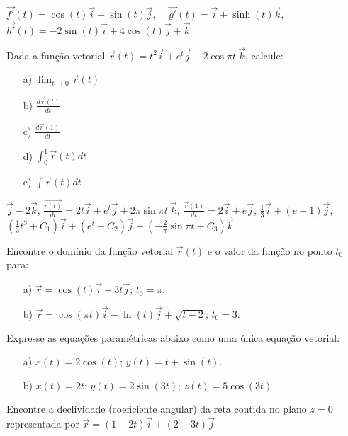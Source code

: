\begin{resp} $\vec{f'}(t)=\cos(t)\vec{i}-\sin(t)\vec{j}$,~~ $\vec{g'}(t)= \vec{i}+\sinh(t)\vec{k}$, ~~$\vec{h'}(t)=-2\sin(t)\vec{i}+4\cos(t)\vec{j}+\vec{k}$
\end{resp}
\begin{exer} Dada a função vetorial $\vec{r}(t)=t^2\vec{i}+e^t\vec{j}-2\cos\pi t ~\! \vec{k}$, calcule:
\begin{itemize}
\item [a)] $\displaystyle \lim_{t\to 0} \vec{r}(t)$
\item [b)] $\displaystyle \frac{d \vec{r}(t)}{dt}$
\item [c)] $\displaystyle \frac{d\vec{r}(1)}{dt}$
\item [d)] $\displaystyle \int_0^1 \vec{r}(t)dt$
\item [e)] $\displaystyle \int \vec{r}(t)dt$
\end{itemize}
\end{exer}
\begin{resp} $\vec{j}-2\vec{k}$, $\frac{\vec{r(t)}}{dt}=2t\vec{i}+e^t\vec{j}+2\pi\sin\pi t ~\! \vec{k}$, $\frac{\vec{r}(1)}{dt}=2\vec{i}+e\vec{j}$, $\frac{1}{3}\vec{i}+(e-1)\vec{j}$, $\left(\frac{1}{3}t^3+C_1\right)\vec{i}+\left(e^t+C_2\right)\vec{j}+\left(-\frac{2}{\pi}\sin\pi t+C_3\right)\vec{k}$
\end{resp}
\begin{exer}Encontre o domínio da função vetorial $\vec{r}(t)$ e o valor da função no ponto $t_0$ para:
\begin{itemize}
 \item[a)] $\vec{r}=\cos(t)\vec{i}-3t\vec{j}$; $t_0=\pi$.
 \item[b)] $\vec{r}=\cos(\pi t)\vec{i}-\ln(t)\vec{j}+\sqrt{t-2}$; $t_0=3$.
\end{itemize}
\end{exer}
\begin{exer}Expresse as equações paramétricas abaixo como uma única equação vetorial:
\begin{itemize}
 \item[a)] $x(t)=2\cos(t)$; $y(t)=t+\sin(t)$.
 \item[b)] $x(t)=2t$; $y(t)=2\sin(3t)$; $z(t)=5\cos(3t)$.
\end{itemize}
\end{exer}
\begin{exer}Encontre a declividade (coeficiente angular) da reta contida no plano $z=0$ representada por $\vec{r}=(1-2t)\vec{i}+(2-3t)\vec{j}$
\end{exer}
